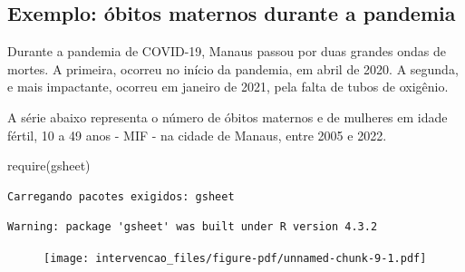 \documentclass[
  letterpaper,
  DIV=11,
  numbers=noendperiod]{scrartcl}
\newenvironment{Shaded}{\begin{snugshade}}{\end{snugshade}}
\newcommand{\AttributeTok}[1]{\textcolor[rgb]{0.40,0.45,0.13}{#1}}
\newcommand{\DecValTok}[1]{\textcolor[rgb]{0.68,0.00,0.00}{#1}}
\newcommand{\FunctionTok}[1]{\textcolor[rgb]{0.28,0.35,0.67}{#1}}
\newcommand{\NormalTok}[1]{\textcolor[rgb]{0.00,0.23,0.31}{#1}}
\newcommand{\OtherTok}[1]{\textcolor[rgb]{0.00,0.23,0.31}{#1}}
\newcommand{\SpecialCharTok}[1]{\textcolor[rgb]{0.37,0.37,0.37}{#1}}
\newcommand{\StringTok}[1]{\textcolor[rgb]{0.13,0.47,0.30}{#1}}
\theoremstyle{plain}
\theoremstyle{plain}
\theoremstyle{definition}
\theoremstyle{definition}
\theoremstyle{remark}
\begin{document}
\hypertarget{exemplo-uxf3bitos-maternos-durante-a-pandemia}{%
\subsection{Exemplo: óbitos maternos durante a
pandemia}\label{exemplo-uxf3bitos-maternos-durante-a-pandemia}}

Durante a pandemia de COVID-19, Manaus passou por duas grandes ondas de
mortes. A primeira, ocorreu no início da pandemia, em abril de 2020. A
segunda, e mais impactante, ocorreu em janeiro de 2021, pela falta de
tubos de oxigênio.

A série abaixo representa o número de óbitos maternos e de mulheres em
idade fértil, 10 a 49 anos - MIF - na cidade de Manaus, entre 2005 e
2022.

\begin{Shaded}
\begin{Highlighting}[]
\FunctionTok{require}\NormalTok{(gsheet)}
\end{Highlighting}
\end{Shaded}

\begin{verbatim}
Carregando pacotes exigidos: gsheet
\end{verbatim}

\begin{verbatim}
Warning: package 'gsheet' was built under R version 4.3.2
\end{verbatim}

\begin{Shaded}
\end{Shaded}

\begin{figure}[H]

{\centering \texttt{[image: intervencao\_files/figure-pdf/unnamed-chunk-9-1.pdf]}

}

\end{figure}
\end{document}

